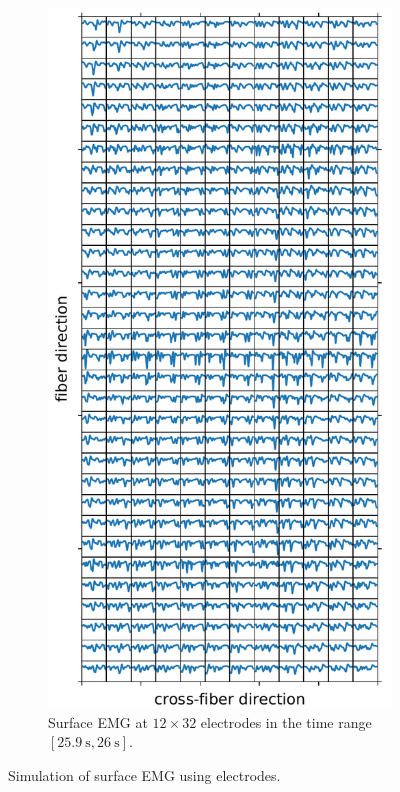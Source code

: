 \begin{figure}
\begin{subfigure}[t]{0.38\textwidth}
    \includegraphics[width=\textwidth]{images/results/application/emg_video_plot.pdf}%
    \caption{Surface EMG at $12 \times 32$ electrodes in the time range $[\SI{25.9}{\s},\SI{26}{\s}]$.}%
    \label{fig:emg_video_plot}%
  \end{subfigure}
  \caption{Simulation of surface EMG using electrodes.}%
  \label{fig:emg_video}%
\end{figure}




